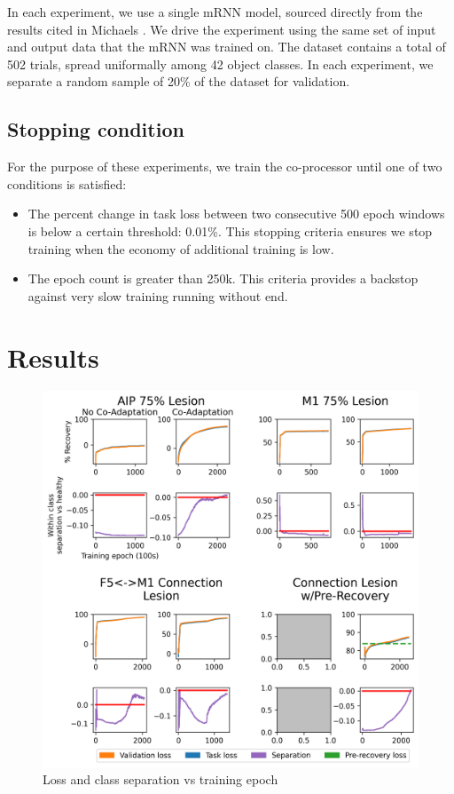 \documentclass[12pt]{iopart}
\begin{document}
In each experiment, we use a single mRNN model, sourced directly from the results
cited in Michaels \cite{michaels.mrnn}. We drive the experiment using the same set of
input and output data that the mRNN was trained on. The dataset contains a total of
502 trials, spread uniformally among 42 object classes. In each experiment, we separate
a random sample of 20\% of the dataset for validation.

\subsection{Stopping condition}
For the purpose of these experiments, we train the co-processor until one of two
conditions is satisfied:

\begin{itemize}
	\item The percent change in task loss between two consecutive 500 epoch windows is below a certain threshold: 0.01\%. This
	      stopping criteria ensures we stop training when the economy of additional training is low.
	\item The epoch count is greater than 250k. This criteria provides a backstop against very slow training running without end.
\end{itemize}

\section{Results}
\label{sec:results}

\begin{figure}[h]
\includegraphics[width=\textwidth]{training_results.png}
\caption{Loss and class separation vs training epoch}
\centering
\label{fig:results}
\end{figure}
\end{document}
